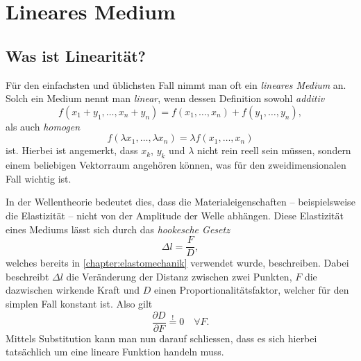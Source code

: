%
%
%
%
\section{Lineares Medium\label{particles:section:linear}}

\subsection{Was ist Linearität?}
Für den einfachsten und üblichsten Fall nimmt man oft ein \emph{lineares Medium} an.
Solch ein Medium nennt man \emph{linear}, wenn dessen Definition sowohl \emph{additiv}
\[
    f(x_{1} + y_{1}, \ldots, x_{n} + y_{n}) 
    = 
    f(x_{1}, \ldots, x_{n}) 
    + 
    f(y_{1}, \ldots, y_{n}),
\]
als auch \emph{homogen}
\[
    f(\lambda x_{1}, \ldots, \lambda x_{n}) 
    = 
    \lambda f(x_{1}, \ldots, x_{n})
\]
ist.
Hierbei ist angemerkt, dass $x_{k}$, $y_{k}$ und $\lambda$ nicht rein reell sein müssen, 
sondern einem beliebigen Vektorraum angehören können, was für den zweidimensionalen Fall wichtig ist.

In der Wellentheorie bedeutet dies, 
dass die Materialeigenschaften -- beispielsweise die Elastizität -- nicht von der Amplitude der Welle abhängen.
Diese Elastizität eines Mediums lässt sich durch das \emph{hookesche Gesetz}
\[
    \Delta l
    = 
    \frac{F}{D}
    \label{particles:eq:hookesches-gesetz},
\]
welches bereits in \autoref{chapter:elastomechanik} verwendet wurde, beschreiben.
Dabei beschreibt $\Delta l$ die Veränderung der Distanz zwischen zwei Punkten,
$F$ die dazwischen wirkende Kraft und $D$ einen Proportionalitätsfaktor, 
welcher für den simplen Fall konstant ist. Also gilt 
\[
    \frac{\partial D}{\partial F} 
    \overset{!}{=} 
    0 
    \quad 
    \forall F.
\]
Mittels Substitution kann man nun darauf schliessen, 
dass es sich hierbei tatsächlich um eine lineare Funktion handeln muss.

